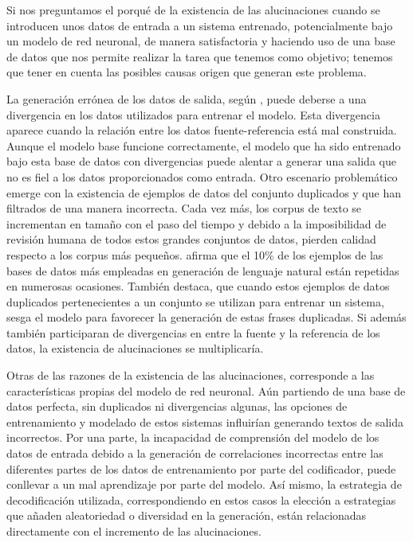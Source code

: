 
Si nos preguntamos el porqué de la existencia de las alucinaciones cuando se introducen unos datos de entrada a un sistema entrenado, potencialmente bajo un modelo de red neuronal, de manera satisfactoria y haciendo uso de una base de datos que nos permite realizar la tarea que tenemos como objetivo; tenemos que tener en cuenta las posibles causas origen que generan este problema.

La generación errónea de los datos de salida, según \cite{hallucination_survey}, puede deberse a una divergencia en los datos utilizados para entrenar el modelo. Esta divergencia aparece cuando la relación entre los datos fuente-referencia está mal construida. Aunque el modelo base funcione correctamente, el modelo que ha sido entrenado bajo esta base de datos con divergencias puede alentar a generar una salida que no es fiel a los datos proporcionados como entrada. Otro escenario problemático emerge con la existencia de ejemplos de datos del conjunto duplicados y que han filtrados de una manera incorrecta. Cada vez más, los corpus de texto se incrementan en tamaño con el paso del tiempo y debido a la imposibilidad de revisión humana de todos estos grandes conjuntos de datos, pierden calidad respecto a los corpus más pequeños. \cite{lee2021deduplicating} afirma que el 10\% de los ejemplos de las bases de datos más empleadas en generación de lenguaje natural están repetidas en numerosas ocasiones. También destaca, que cuando estos ejemplos de datos duplicados pertenecientes a un conjunto se utilizan para entrenar un sistema, sesga el modelo para favorecer la generación de estas frases duplicadas. Si además también participaran de divergencias en entre la fuente y la referencia de los datos, la existencia de alucinaciones se multiplicaría.


Otras de las razones de la existencia de las alucinaciones, corresponde a las características propias del modelo de red neuronal. Aún partiendo de una base de datos perfecta, sin duplicados ni divergencias algunas, las opciones de entrenamiento y modelado de estos sistemas influirían generando textos de salida incorrectos. Por una parte, la incapacidad de comprensión del modelo de los datos de entrada debido a la generación de correlaciones incorrectas entre las diferentes partes de los datos de entrenamiento por parte del codificador, puede conllevar a un mal aprendizaje por parte del modelo. Así mismo, la estrategia de decodificación utilizada, correspondiendo en estos casos la elección a estrategias que añaden aleatoriedad o diversidad en la generación, están relacionadas directamente con el incremento de las alucinaciones.

